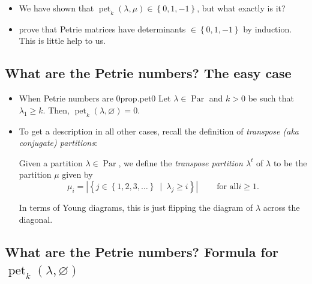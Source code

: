 \documentclass[numbers=enddot,12pt,final,onecolumn,notitlepage]{scrartcl}%
\newcommand{\defn}[1]{{\color{darkred}\emph{#1}}}
\newcommand{\0}{\phantom{c}}
\newcommand{\nowbox}{\hphantom{x} \vspace{-1.5pc}}
\begin{document}
\begin{itemize}
\item We have shown that $\operatorname*{pet}\nolimits_{k}\left(  \lambda
,\mu\right)  \in\left\{  0,1,-1\right\}  $, but what exactly is it?

\item
{} prove that Petrie matrices have determinants $\in\left\{
0,1,-1\right\}  $ by induction. This is little help to us.
\end{itemize}

\subsection{What are the Petrie numbers? The easy case}

\begin{itemize}
\item \nowbox
\begin{proposition}{When Petrie numbers are 0}{prop.pet0}
Let $\lambda\in\operatorname*{Par}$ and $k>0$ be
such that $\lambda_{1}\geq k$. Then, $\operatorname*{pet}\nolimits_{k}\left(
\lambda,\varnothing\right)  =0$.
\end{proposition}

\item To get a description in all other cases, recall the definition of \defn{transpose (aka conjugate) partitions}:

Given a partition $\lambda\in\operatorname*{Par}$, we define the
\defn{transpose partition $\lambda^t$} of $\lambda$ to be the partition $\mu$
given by%
\[
\mu_{i}=\left\vert \left\{  j\in\left\{  1,2,3,\ldots\right\}  \ \mid
\ \lambda_{j}\geq i\right\}  \right\vert \ \ \ \ \ \ \ \ \ \ \text{for all
}i\geq1.
\]


In terms of Young diagrams, this is just flipping the diagram of $\lambda$
across the diagonal.
\end{itemize}

\subsection{What are the Petrie numbers? Formula for $\operatorname{pet}%
_{k}\left(  \lambda,\varnothing\right)  $}
\end{document}
